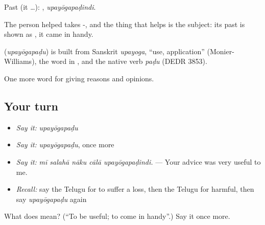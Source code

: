 Past (it …): , \emph{upayōgapaḍindi}.

The person helped takes -, and the thing that helps is the subject: its past is shown as , it came in handy.

\begin{cousinweb}
\textbf{} (\emph{upayōgapaḍu}) is built from Sanskrit \emph{upayoga}, \textquotedblleft{}use, application\textquotedblright{} (Monier-Williams), the word in , and the native verb \emph{paḍu} (DEDR 3853).
\end{cousinweb}

\begin{grammarlens}[title={What you've built}]
One more word for giving reasons and opinions.
\end{grammarlens}

\subsection*{Your turn}
\begin{itemize}
\raggedright
  \item \emph{Say it:} \emph{upayōgapaḍu}
  \item \emph{Say it:} \emph{upayōgapaḍu}, once more
  \item \emph{Say it:} \emph{mī salahā nāku cālā upayōgapaḍindi.} — Your advice was very useful to me.
  \item \emph{Recall:} say the Telugu for to suffer a loss, then the Telugu for harmful, then say \emph{upayōgapaḍu} again
\end{itemize}

\begin{tcolorbox}[breakable,colback=teal!4,colframe=teal!35!black,title={Before you move on}]
What does  mean? (\textquotedblleft{}To be useful; to come in handy\textquotedblright{}.) Say it once more.
\end{tcolorbox}
